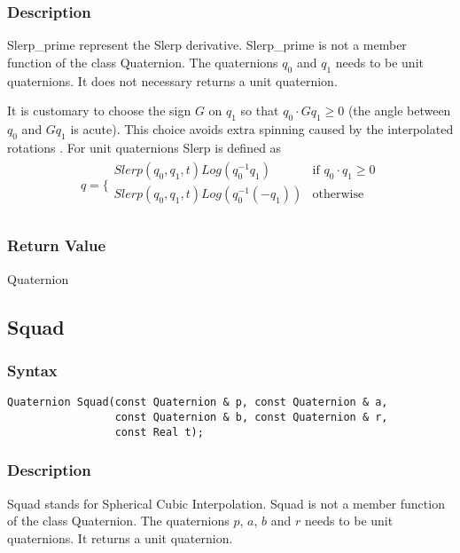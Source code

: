 \documentclass[11pt,fleqn,letterpaper]{report}
\begin{document}
\subsubsection{Description}
Slerp\_prime represent the Slerp derivative.  Slerp\_prime is not a
member function of the class Quaternion.  The quaternions $q_0$ and
$q_1$ needs to be unit quaternions.  It does not necessary returns a
unit quaternion.

It is customary to choose the sign $G$ on $q_1$ so that $q_0 \cdot
Gq_1 \geq 0$ (the angle between $q_0$ and $Gq_1$ is acute). This
choice avoids extra spinning caused by the interpolated rotations
\cite{Dam98}. For unit quaternions Slerp is defined as
\begin{eqnarray}
 q = \Bigg\{
  \begin{array}{cc}
    Slerp(q_0, q_1, t)Log(q_0^{-1}q_1) & \textrm{if $q_0 \cdot q_1 \geq 0$} \\
    Slerp(q_0, q_1, t)Log(q_0^{-1}(-q_1)) & \textrm{otherwise} \\
  \end{array}
\end{eqnarray}

\subsubsection*{Return Value}

Quaternion

\newpage

\subsection*{Squad}

\subsubsection*{Syntax}
\begin{verbatim}
Quaternion Squad(const Quaternion & p, const Quaternion & a, 
                 const Quaternion & b, const Quaternion & r, 
                 const Real t);
\end{verbatim}
\subsubsection{Description}
Squad stands for Spherical Cubic Interpolation. Squad is not a member
function of the class Quaternion. The quaternions $p$, $a$, $b$ and
$r$ needs to be unit quaternions. It returns a unit quaternion.
\end{document}
